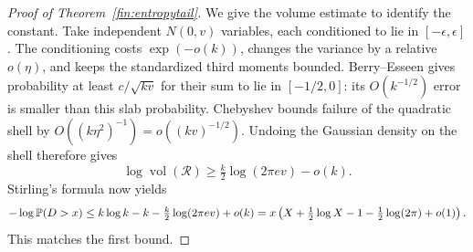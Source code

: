 \begin{proof}[Proof of Theorem~\ref{fin:entropytail}]
We give the volume estimate to identify the constant.
Take independent $N(0,v)$ variables, each conditioned to lie in
$[-\epsilon,\epsilon]$.  The conditioning costs
$\exp(-o(k))$, changes the variance by a relative $o(\eta)$, and
keeps the standardized third moments bounded.
Berry--Esseen gives probability at least $c/\sqrt{kv}$ for their
sum to lie in $[-1/2,0]$: its $O(k^{-1/2})$ error is smaller than this
slab probability.  Chebyshev bounds failure of the quadratic shell by
$O((k\eta^2)^{-1})=o((kv)^{-1/2})$.
Undoing the Gaussian density on the shell therefore gives
\[
 \log\operatorname{vol}(\mathcal R)
 \ge \tfrac k2\log(2\pi ev)-o(k).
\]
Stirling's formula now yields
\[
 -\log\mathbb P(D>x)
 \le k\log k-k-\tfrac k2\log(2\pi ev)+o(k)
 =x\left(X+\tfrac12\log X-1-\tfrac12\log(2\pi)+o(1)\right).
\]
This matches the first bound.
\end{proof}

